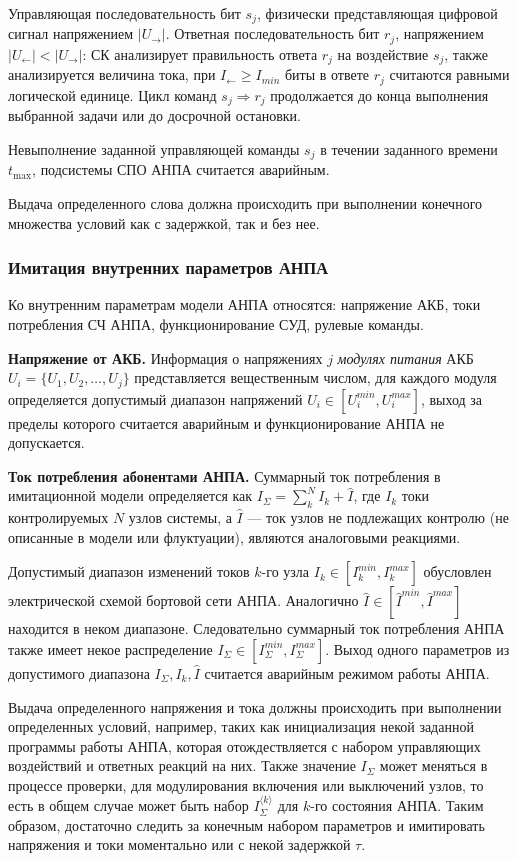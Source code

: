 Управляющая последовательность бит $s_j$, физически представляющая цифровой сигнал напряжением $|U_{\longrightarrow}|$.
Ответная последовательность бит $r_j$, напряжением $|U_{\longleftarrow}| < |U_{\longrightarrow}|$:
СК анализирует правильность ответа $r_j$ на воздействие $s_j$,
также анализируется величина тока, при $I_{\longleftarrow} \geq I_{min}$ биты в ответе $r_j$ считаются равными логической единице.
Цикл команд $s_j \Rightarrow r_j$ продолжается до конца выполнения выбранной задачи или до досрочной остановки.

Невыполнение заданной управляющей команды $s_j$ в течении заданного времени $t_{\mbox{max}}$,
подсистемы СПО АНПА считается аварийным.

Выдача определенного слова должна происходить при выполнении конечного множества условий как с задержкой, так и без нее.


\subsubsection{Имитация внутренних параметров АНПА}\label{sec:model_anpa:inner_params}
Ко внутренним параметрам модели АНПА относятся: 
напряжение АКБ,
токи потребления СЧ АНПА,
функционирование СУД,
рулевые команды.


\textbf{Напряжение от АКБ.}
Информация о напряжениях $j$ \textit{модулях питания} АКБ $U_i = \{U_1, U_2, \ldots, U_j\}$ представляется вещественным числом,
для каждого модуля определяется допустимый диапазон напряжений $U_i \in [U_i^{min}, U_i^{max}]$,
выход за пределы которого считается аварийным и функционирование АНПА не допускается.

\textbf{Ток потребления абонентами АНПА.}
Суммарный ток потребления в имитационной модели определяется как $I_\Sigma = \sum_k^N I_k + \hat I$,
где $I_k$ токи контролируемых $N$ узлов системы, а $\hat I$ --- ток узлов не подлежащих контролю (не описанные в модели или флуктуации),
являются аналоговыми реакциями. %

Допустимый диапазон изменений токов $k$-го узла $I_k \in [I_k^{min}, I_k^{max}]$ обусловлен электрической схемой бортовой сети АНПА.
Аналогично $\hat I \in [\hat I^{min}, \hat I^{max}]$ находится в неком диапазоне.
Следовательно суммарный ток потребления АНПА также имеет некое распределение $I_\Sigma \in [I_\Sigma^{min}, I_\Sigma^{max}]$.
Выход одного параметров из допустимого диапазона $I_\Sigma, I_k, \hat I$ считается аварийным режимом работы АНПА.

Выдача определенного напряжения и тока должны происходить при выполнении определенных условий,
например, таких как инициализация некой заданной программы работы АНПА, которая
отождествляется с набором управляющих воздействий и ответных реакций на них.
Также значение $I_\Sigma$ может меняться в процессе проверки, для модулирования включения или выключений узлов,
то есть в общем случае может быть набор $I_\Sigma^{\langle k \rangle}$ для $k$-го состояния АНПА.
Таким образом, достаточно следить за конечным набором параметров и
имитировать напряжения и токи моментально или с некой задержкой $\tau$.

